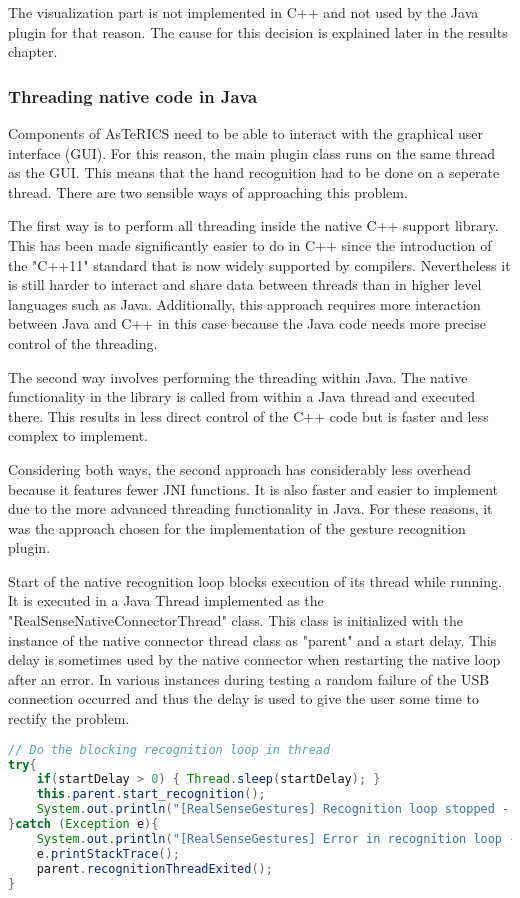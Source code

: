 \documentclass[BSA,Bachelor,english]{twbook}%
\begin{document}
The visualization part is not implemented in C++ and not used by the Java plugin for that reason. The cause for this decision is explained later in the results chapter.

\subsubsection{Threading native code in Java}

Components of AsTeRICS need to be able to interact with the graphical user interface (GUI). For this reason, the main plugin class runs on the same thread as the GUI. This means that the hand recognition had to be done on a seperate thread. There are two sensible ways of approaching this problem.

The first way is to perform all threading inside the native C++ support library. This has been made significantly easier to do in C++ since the introduction of the "C++11" standard that is now widely supported by compilers. Nevertheless it is still harder to interact and share data between threads than in higher level languages such as Java. Additionally, this approach requires more interaction between Java and C++ in this case because the Java code needs more precise control of the threading.

The second way involves performing the threading within Java. The native functionality in the library is called from within a Java thread and executed there. This results in less direct control of the C++ code but is faster and less complex to implement.

Considering both ways, the second approach has considerably less overhead because it features fewer JNI functions. It is also faster and easier to implement due to the more advanced threading functionality in Java. For these reasons, it was the approach chosen for the implementation of the gesture recognition plugin.

Start of the native recognition loop blocks execution of its thread while running. It is executed in a Java Thread implemented as the "RealSenseNativeConnectorThread" class. This class is initialized with the instance of the native connector thread class as "parent" and a start delay. This delay is sometimes used by the native connector when restarting the native loop after an error. In various instances during testing a random failure of the USB connection occurred and thus the delay is used to give the user some time to rectify the problem.


\begin{lstlisting}[language=Java,name={Functionality inside the native connector threading class},label={rs:javaplugin:6}]
// Do the blocking recognition loop in thread
try{
	if(startDelay > 0) { Thread.sleep(startDelay); }
	this.parent.start_recognition();
	System.out.println("[RealSenseGestures] Recognition loop stopped - Thread exiting");
}catch (Exception e){
	System.out.println("[RealSenseGestures] Error in recognition loop - stack trace below");
	e.printStackTrace();
	parent.recognitionThreadExited();
}
\end{lstlisting}
\end{document}
